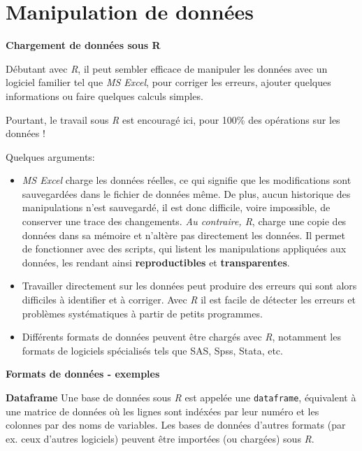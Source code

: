 \documentclass[]{book}
\providecommand{\tightlist}{%
  \setlength{\itemsep}{0pt}\setlength{\parskip}{0pt}}
\begin{document}
\hypertarget{manipulation-de-donnees}{%
\section{Manipulation de données}\label{manipulation-de-donnees}}

\textbf{Chargement de données sous R}

Débutant avec \emph{R}, il peut sembler efficace de manipuler les données avec un logiciel familier tel que \emph{MS Excel}, pour corriger les erreurs, ajouter quelques informations ou faire quelques calculs simples.

Pourtant, le travail sous \emph{R} est encouragé ici, pour 100\% des opérations sur les données !

Quelques arguments:

\begin{itemize}
\tightlist
\item
  \emph{MS Excel} charge les données réelles, ce qui signifie que les modifications sont sauvegardées dans le fichier de données même. De plus, aucun historique des manipulations n'est sauvegardé, il est donc difficile, voire impossible, de conserver une trace des changements. \emph{Au contraire, R}, charge une copie des données dans sa mémoire et n'altère pas directement les données. Il permet de fonctionner avec des scripts, qui listent les manipulations appliquées aux données, les rendant ainsi \textbf{reproductibles} et \textbf{transparentes}.\\
\item
  Travailler directement sur les données peut produire des erreurs qui sont alors difficiles à identifier et à corriger. Avec \emph{R} il est facile de détecter les erreurs et problèmes systématiques à partir de petits programmes.\\
\item
  Différents formats de données peuvent être chargés avec \emph{R}, notamment les formats de logiciels spécialisés tels que SAS, Spss, Stata, etc.
\end{itemize}

\textbf{Formats de données - exemples}

\textbf{Dataframe}
Une base de données sous \emph{R} est appelée une \texttt{dataframe}, équivalent à une matrice de données où les lignes sont indéxées par leur numéro et les colonnes par des noms de variables.
Les bases de données d'autres formats (par ex. ceux d'autres logiciels) peuvent être importées (ou chargées) sous \emph{R}.
\end{document}
